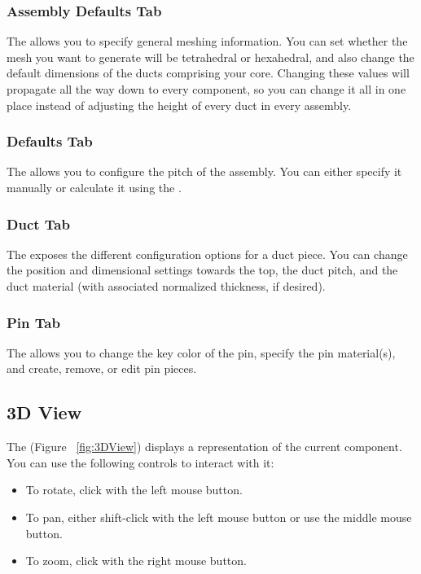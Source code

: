 \subsubsection{Assembly Defaults Tab}
The  allows you to specify general meshing information.  You can set whether the mesh you want to generate will be tetrahedral or hexahedral, and also change the default dimensions of the ducts comprising your core.  Changing these values will propagate all the way down to every component, so you can change it all in one place instead of adjusting the height of every duct in every assembly.

\subsubsection{Defaults Tab}
The  allows you to configure the pitch of the assembly.  You can either specify it manually or calculate it using the .

\subsubsection{Duct Tab}
The  exposes the different configuration options for a duct piece.  You can change the position and dimensional settings towards the top, the duct pitch, and the duct material (with associated normalized thickness, if desired).

\subsubsection{Pin Tab}
The  allows you to change the key color of the pin, specify the pin material(s), and create, remove, or edit pin pieces.

\subsection{3D View}
The  (Figure ~\ref{fig:3DView}) displays a representation of the current component.  You can use the following controls to interact with it:

\begin{itemize}
	\item{To rotate, click with the left mouse button.}
	\item{To pan, either shift-click with the left mouse button or use the middle mouse button.}
	\item{To zoom, click with the right mouse button.}
\end{itemize}

